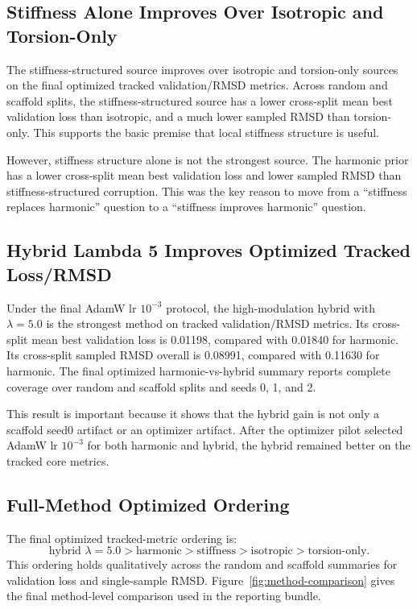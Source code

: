 \documentclass[11pt]{article}
\begin{document}
\subsection{Stiffness Alone Improves Over Isotropic and Torsion-Only}

The stiffness-structured source improves over isotropic and torsion-only sources on the final optimized tracked validation/RMSD metrics. Across random and scaffold splits, the stiffness-structured source has a lower cross-split mean best validation loss than isotropic, and a much lower sampled RMSD than torsion-only. This supports the basic premise that local stiffness structure is useful.

However, stiffness structure alone is not the strongest source. The harmonic prior has a lower cross-split mean best validation loss and lower sampled RMSD than stiffness-structured corruption. This was the key reason to move from a ``stiffness replaces harmonic'' question to a ``stiffness improves harmonic'' question.



\subsection{Hybrid Lambda 5 Improves Optimized Tracked Loss/RMSD}

Under the final AdamW lr $10^{-3}$ protocol, the high-modulation hybrid with $\lambda=5.0$ is the strongest method on tracked validation/RMSD metrics. Its cross-split mean best validation loss is 0.01198, compared with 0.01840 for harmonic. Its cross-split sampled RMSD overall is 0.08991, compared with 0.11630 for harmonic. The final optimized harmonic-vs-hybrid summary reports complete coverage over random and scaffold splits and seeds 0, 1, and 2.

This result is important because it shows that the hybrid gain is not only a scaffold seed0 artifact or an optimizer artifact. After the optimizer pilot selected AdamW lr $10^{-3}$ for both harmonic and hybrid, the hybrid remained better on the tracked core metrics.

\subsection{Full-Method Optimized Ordering}

The final optimized tracked-metric ordering is:
\begin{equation}
\text{hybrid } \lambda=5.0 > \text{harmonic} > \text{stiffness} > \text{isotropic} > \text{torsion-only}.
\end{equation}
This ordering holds qualitatively across the random and scaffold summaries for validation loss and single-sample RMSD. Figure~\ref{fig:method-comparison} gives the final method-level comparison used in the reporting bundle.
\end{document}
